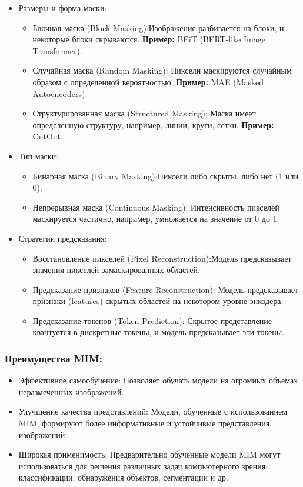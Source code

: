 \begin{itemize}
    \item Размеры и форма маски:
        \begin{itemize}
            \item Блочная маска (Block Masking):Изображение разбивается на блоки, и некоторые блоки скрываются.  
            \textbf{Пример:}  BEiT (BERT-like Image Transformer).
            \item Случайная маска (Random Masking): Пиксели маскируются случайным образом с определенной вероятностью. 
            \textbf{Пример:} MAE (Masked Autoencoders).
            \item Структурированная маска (Structured Masking): Маска имеет определенную структуру, например, линии, круги, сетки. 
            \textbf{Пример:} CutOut.
        \end{itemize}
    \item Тип маски:
        \begin{itemize}
            \item Бинарная маска (Binary Masking):Пиксели либо скрыты, либо нет (1 или 0).
            \item Непрерывная маска (Continuous Masking): Интенсивность пикселей маскируется частично, например, умножается на значение от 0 до 1.
        \end{itemize}
    \item Стратегии предсказания:
        \begin{itemize}
            \item Восстановление пикселей (Pixel Reconstruction):Модель предсказывает значения пикселей замаскированных областей.
            \item Предсказание признаков (Feature Reconstruction): Модель предсказывает признаки (features) скрытых областей на некотором уровне энкодера. 
            \item Предсказание токенов (Token Prediction): Скрытое представление квантуется в дискретные токены, и модель предсказывает эти токены.
        \end{itemize}
\end{itemize}

\subsubsection{Преимущества MIM:}
\begin{itemize}
    \item Эффективное самообучение: Позволяет обучать модели на огромных объемах неразмеченных изображений.
    \item Улучшение качества представлений: Модели, обученные с использованием MIM, формируют более информативные и устойчивые представления изображений.
    \item Широкая применимость: Предварительно обученные модели MIM могут использоваться для решения различных задач компьютерного зрения: классификации, обнаружения объектов, сегментации и др.
\end{itemize}


